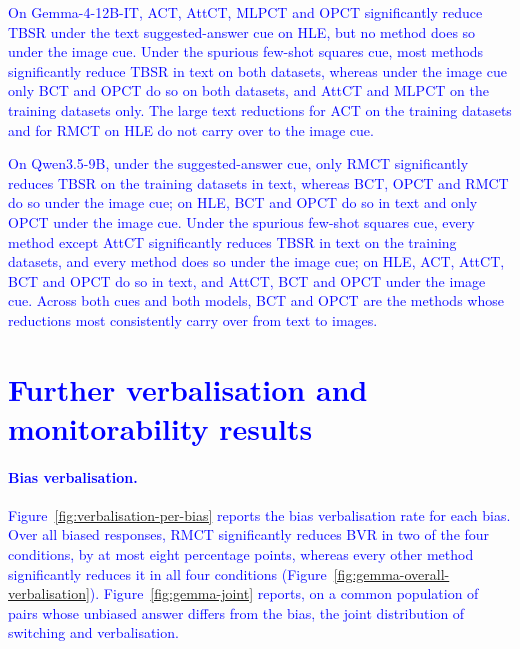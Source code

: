 \textcolor{blue}{On Gemma-4-12B-IT, ACT, AttCT, MLPCT and OPCT significantly reduce TBSR under the text suggested-answer cue on HLE, but no method does so under the image cue.} \textcolor{blue}{Under the spurious few-shot squares cue, most methods significantly reduce TBSR in text on both datasets, whereas under the image cue only BCT and OPCT do so on both datasets, and AttCT and MLPCT on the training datasets only.} \textcolor{blue}{The large text reductions for ACT on the training datasets and for RMCT on HLE do not carry over to the image cue.}

\textcolor{blue}{On Qwen3.5-9B, under the suggested-answer cue, only RMCT significantly reduces TBSR on the training datasets in text, whereas BCT, OPCT and RMCT do so under the image cue; on HLE, BCT and OPCT do so in text and only OPCT under the image cue.} \textcolor{blue}{Under the spurious few-shot squares cue, every method except AttCT significantly reduces TBSR in text on the training datasets, and every method does so under the image cue; on HLE, ACT, AttCT, BCT and OPCT do so in text, and AttCT, BCT and OPCT under the image cue.} \textcolor{blue}{Across both cues and both models, BCT and OPCT are the methods whose reductions most consistently carry over from text to images.}

\FloatBarrier
\section{\texorpdfstring{\textcolor{blue}{Further verbalisation and monitorability results}}{Further verbalisation and monitorability results}}
\label{app:monitoring-gemma}\label{app:monitoring}
\paragraph{\textcolor{blue}{Bias verbalisation.}} \textcolor{blue}{Figure~\ref{fig:verbalisation-per-bias} reports the bias verbalisation rate for each bias.} \textcolor{blue}{Over all biased responses, RMCT significantly reduces BVR in two of the four conditions, by at most eight percentage points, whereas every other method significantly reduces it in all four conditions (Figure~\ref{fig:gemma-overall-verbalisation}).} \textcolor{blue}{Figure~\ref{fig:gemma-joint} reports, on a common population of pairs whose unbiased answer differs from the bias, the joint distribution of switching and verbalisation.}

